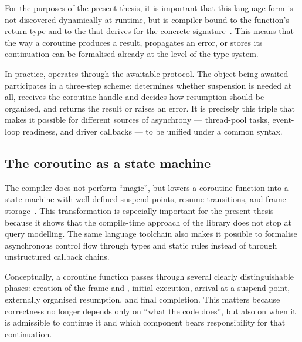 For the purposes of the present thesis, it is important that this language form is not discovered dynamically at runtime, but is compiler-bound to the function's return type and to the  that  derives for the concrete signature~\cite{cpp20standard,p0912r5}. This means that the way a coroutine produces a result, propagates an error, or stores its continuation can be formalised already at the level of the type system.

In practice,  operates through the awaitable protocol. The object being awaited participates in a three-step scheme:  determines whether suspension is needed at all,  receives the coroutine handle and decides how resumption should be organised, and  returns the result or raises an error. It is precisely this triple that makes it possible for different sources of asynchrony --- thread-pool tasks, event-loop readiness, and driver callbacks --- to be unified under a common  syntax.

\subsection{The coroutine as a state machine}

The compiler does not perform “magic”, but lowers a coroutine function into a state machine with well-defined suspend points, resume transitions, and frame storage~\cite{p0912r5,p1063r0}. This transformation is especially important for the present thesis because it shows that the compile-time approach of the library does not stop at query modelling. The same language toolchain also makes it possible to formalise asynchronous control flow through types and static rules instead of through unstructured callback chains.

Conceptually, a coroutine function passes through several clearly distinguishable phases: creation of the frame and , initial execution, arrival at a suspend point, externally organised resumption, and final completion. This matters because correctness no longer depends only on “what the code does”, but also on when it is admissible to continue it and which component bears responsibility for that continuation.

